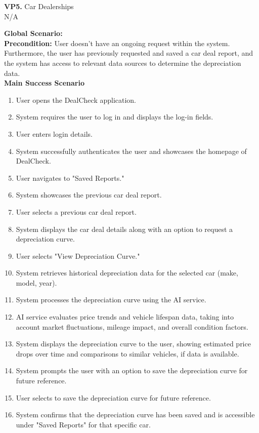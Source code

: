 \documentclass[]{article}
\begin{document}
\begin{enumerate}
\begin{enumerate}[{\bf {BE}1.}]
		\textbf{VP5.} Car Dealerships \\ N/A  
	
	{\bf Global Scenario:}\\
	{\bf Precondition:} User doesn't have an ongoing request within the system. Furthermore, the user has previously requested and saved a car deal report, and the system 
	has access to relevant data sources to determine the depreciation data. \\

	{\bf Main Success Scenario}
	\begin{enumerate}[1.]
		\item User opens the DealCheck application.
		\item System requires the user to log in and displays the log-in fields.
		\item User enters login details.
		\item System successfully authenticates the user and showcases the homepage of DealCheck.
		\item User navigates to "Saved Reports."
		\item System showcases the previous car deal report.
		\item User selects a previous car deal report.
		\item System displays the car deal details along with an option to request a depreciation curve.
		\item User selects "View Depreciation Curve."
		\item System retrieves historical depreciation data for the selected car (make, model, year).
		\item System processes the depreciation curve using the AI service.
		\item AI service evaluates price trends and vehicle lifespan data, taking into account market fluctuations, mileage impact, and overall condition factors.
		\item System displays the depreciation curve to the user, showing estimated price drops over time and comparisons to similar vehicles, if data is available.
		\item System prompts the user with an option to save the depreciation curve for future reference.
		\item User selects to save the depreciation curve for future reference.
		\item System confirms that the depreciation curve has been saved and is accessible under "Saved Reports" for that specific car.
	\end{enumerate}


\end{enumerate}
\end{enumerate}
\end{document}
